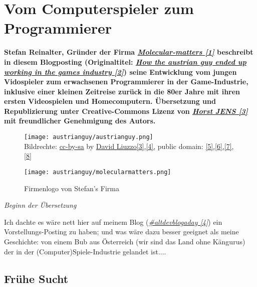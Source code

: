 \section*{Vom Computerspieler zum Programmierer} 
\hypertarget{austrianguy}{}
\label{austrianguy}

\textbf{Stefan Reinalter, Gründer der Firma \href{http://www.molecular-matters.com/}{\textit{Molecular-matters [1]}} beschreibt in diesem Blogposting (Originaltitel: \href{http://www.altdevblogaday.com/2011/09/27/how-the-austrian-guy-ended-up-working-in-the-games-industry/}{\textit{How the austrian guy ended up working in the games industry [2]}}) seine Entwicklung vom jungen Vidospieler zum erwachsenen Programmierer in der Game-Industrie, inklusive einer kleinen Zeitreise zurück in die 80er Jahre mit ihren ersten Videospielen und Homecomputern. Übersetzung und Republizierung unter Creative-Commons Lizenz von \href{http://spielend-programmieren.at}{\textit{Horst JENS [3]}} mit freundlicher Genehmigung des Autors.}
\begin{figure}
\texttt{[image: austrianguy/austrianguy.png]} \\
\caption{Bildrechte: \href{https://creativecommons.org/licenses/by-sa/4.0/deed.en}{cc-by-sa} by \href{https://commons.wikimedia.org/wiki/User:David_Liuzzo}{David Liuzzo[3],}\href{https://commons.wikimedia.org/wiki/File:EU_location_AUT.png}{[4],} public domain: \href{http://openclipart.org/detail/175351/playstation-controller-by-matthewhenninger-175351}{[5],}\href{http://openclipart.org/detail/21847/comic-characters:-bearded-guy-by-nicubunu}{[6],}\href{http://openclipart.org/detail/7885/blue-world-map-by-neocreo}{[7],}\href{http://openclipart.org/detail/12612/flag-of-austria-by-anonymous}{[8]}}
\texttt{[image: austrianguy/molecularmatters.png]} \\
\caption{Firmenlogo von Stefan's Firma}
\end{figure}

\textit{Beginn der Übersetzung}

Ich dachte es wäre nett hier auf meinem Blog (\href{http://www.altdevblogaday.com/}{\textit{\#altdevblogaday [4]}}) ein Vorstellungs-Posting zu haben; und was wäre dazu besser geeignet als meine Geschichte: von einem Bub aus Österreich (wir sind das Land ohne Kängurus) der in der (Computer)Spiele-Industrie gelandet ist....

\subsection*{Frühe Sucht}

